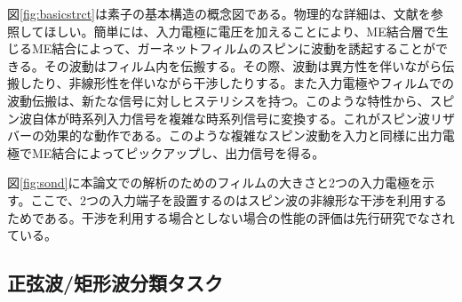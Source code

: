 \documentclass[a4j, twocolumn]{jsarticle}
\begin{document}
図\ref{fig:basicstrct}は素子の基本構造の概念図である。物理的な詳細は、文献を参照してほしい\cite{Nakane2018IEEEAccess:_Reser_Compu_with_spin_waves_Excit_in_a_Garne_film,Nakane2018ICM:_demon_of_spin_wave_based_reser_compu_for_next_gener_machi_learn_devic}。簡単には、入力電極に電圧を加えることにより、ME結合層で生じるME結合によって、ガーネットフィルムのスピンに波動を誘起することができる。その波動はフィルム内を伝搬する。その際、波動は異方性を伴いながら伝搬したり、非線形性を伴いながら干渉したりする。また入力電極やフィルムでの波動伝搬は、新たな信号に対しヒステリシスを持つ。このような特性から、スピン波自体が時系列入力信号を複雑な時系列信号に変換する。これがスピン波リザバーの効果的な動作である。このような複雑なスピン波動を入力と同様に出力電極でME結合によってピックアップし、出力信号を得る。

図\ref{fig:sond}に本論文での解析のためのフィルムの大きさと2つの入力電極を示す。ここで、2つの入力端子を設置するのはスピン波の非線形な干渉を利用するためである。干渉を利用する場合としない場合の性能の評価は先行研究でなされている\cite{Nakane2018IEEEAccess:_Reser_Compu_with_spin_waves_Excit_in_a_Garne_film,Nakane2018ICM:_demon_of_spin_wave_based_reser_compu_for_next_gener_machi_learn_devic}。

\subsection{正弦波/矩形波分類タスク}
\label{subsec:task}
\end{document}
